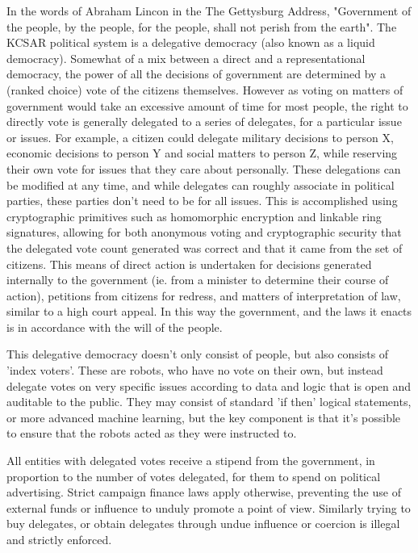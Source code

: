 \documentclass[10pt]{article}
\begin{document}
In the words of Abraham Lincon in the The Gettysburg Address, "Government of the people, by the people, for the people, shall not perish from the earth". The KCSAR political system is a delegative democracy (also known as a liquid democracy). Somewhat of a mix between a direct and a representational democracy, the power of all the decisions of government are determined by a (ranked choice) vote of the citizens themselves. However as voting on matters of government would take an excessive amount of time for most people, the right to directly vote is generally delegated to a series of delegates, for a particular issue or issues. For example, a citizen could delegate military decisions to person X, economic decisions to person Y and social matters to person Z, while reserving their own vote for issues that they care about personally. These delegations can be modified at any time, and while delegates can roughly associate in political parties, these parties don't need to be for all issues. This is accomplished using cryptographic primitives such as homomorphic encryption and linkable ring signatures, allowing for both anonymous voting and cryptographic security that the delegated vote count generated was correct and that it came from the set of citizens. This means of direct action is undertaken for decisions generated internally to the government (ie. from a minister to determine their course of action), petitions from citizens for redress, and matters of interpretation of law, similar to a high court appeal. In this way the government, and the laws it enacts is in accordance with the will of the people.

This delegative democracy doesn't only consist of people, but also consists of 'index voters'. These are robots, who have no vote on their own, but instead delegate votes on very specific issues according to data and logic that is open and auditable to the public. They may consist of standard 'if then' logical statements, or more advanced machine learning, but the key component is that it's possible to ensure that the robots acted as they were instructed to.

All entities with delegated votes receive a stipend from the government, in proportion to the number of votes delegated, for them to spend on political advertising. Strict campaign finance laws apply otherwise, preventing the use of external funds or influence to unduly promote a point of view. Similarly trying to buy delegates, or obtain delegates through undue influence or coercion is illegal and strictly enforced.
\end{document}

